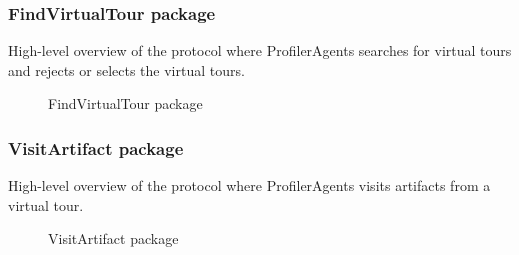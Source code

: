 \documentclass[paper=letter, fontsize=12pt]{article}
\begin{document}
\subsubsection{FindVirtualTour package}
High-level overview of the protocol where ProfilerAgents searches for virtual tours and rejects or selects the virtual tours.
\begin{figure}[H]
  \begin{center}
    \caption{FindVirtualTour package}
    \label{fig:find_virtual_tour}
  \end{center}
\end{figure}
\subsubsection{VisitArtifact package}
High-level overview of the protocol where ProfilerAgents visits artifacts from a virtual tour.
\begin{figure}[H]
  \begin{center}
    \caption{VisitArtifact package}
    \label{fig:visit_artifact}
  \end{center}
\end{figure}
\end{document}
